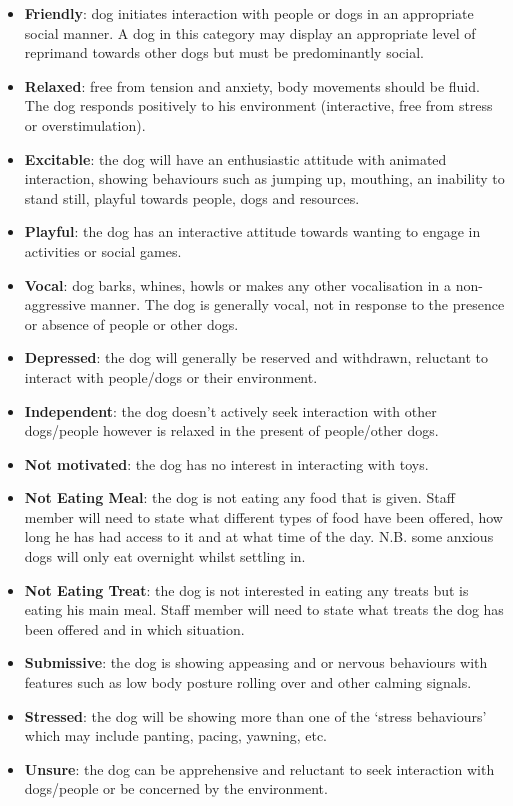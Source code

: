 \documentclass[12pt]{article}
\begin{document}
\begin{itemize}
  \item \textbf{Friendly}: dog initiates interaction with people or dogs in an appropriate social manner. A dog in this category may display an appropriate level of reprimand towards other dogs but must be predominantly social.
  \item \textbf{Relaxed}: free from tension and anxiety, body movements should be fluid. The dog responds positively to his environment (interactive, free from stress or overstimulation).
  \item \textbf{Excitable}: the dog will have an enthusiastic attitude with animated interaction, showing behaviours such as jumping up, mouthing, an inability to stand still, playful towards people, dogs and resources.
  \item \textbf{Playful}: the dog has an interactive attitude towards wanting to engage in activities or social games.
  \item \textbf{Vocal}: dog barks, whines, howls or makes any other vocalisation in a non-aggressive manner. The dog is generally vocal, not in response to the presence or absence of people or other dogs.
  \item \textbf{Depressed}: the dog will generally be reserved and withdrawn, reluctant to interact with people/dogs or their environment.
  \item \textbf{Independent}: the dog doesn’t actively seek interaction with other dogs/people however is relaxed in the present of people/other dogs.
  \item \textbf{Not motivated}: the dog has no interest in interacting with toys.
  \item \textbf{Not Eating Meal}: the dog is not eating any food that is given. Staff member will need to state what different types of food have been offered, how long he has had access to it and at what time of the day. N.B. some anxious dogs will only eat overnight whilst settling in.
  \item \textbf{Not Eating Treat}: the dog is not interested in eating any treats but is eating his main meal. Staff member will need to state what treats the dog has been offered and in which situation.
  \item \textbf{Submissive}: the dog is showing appeasing and or nervous behaviours with features such as low body posture rolling over and other calming signals.
  \item \textbf{Stressed}: the dog will be showing more than one of the ‘stress behaviours’ which may include panting, pacing, yawning, etc.
  \item \textbf{Unsure}: the dog can be apprehensive and reluctant to seek interaction with dogs/people or be concerned by the environment.
\end{itemize}
\end{document}
